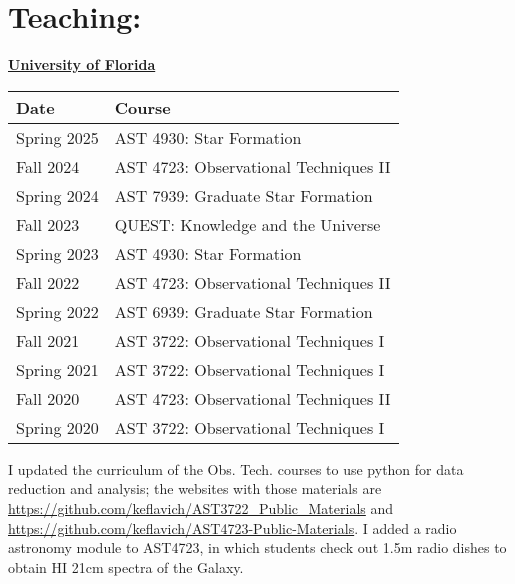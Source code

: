 \begin{minipage}{\textwidth}
\setlength{\extrarowheight}{4pt}
\section*{Teaching: }
\vspace{-6pt}

    \textbf{\underline{University of Florida}}

\begin{tabular}{ll}
    Date         & Course \\%
    \hline
     Spring 2025  &   AST 4930: Star Formation \\
     Fall 2024    &   AST 4723: Observational Techniques II \\
     Spring 2024  &   AST 7939: Graduate Star Formation \\
     Fall 2023    &   QUEST: Knowledge and the Universe \\
     Spring 2023  &   AST 4930: Star Formation \\
     Fall 2022    &   AST 4723: Observational Techniques II \\
     Spring 2022  &   AST 6939: Graduate Star Formation \\
     Fall 2021    &   AST 3722: Observational Techniques I  \\%
     Spring 2021  &   AST 3722: Observational Techniques I  \\%
     Fall 2020    &   AST 4723: Observational Techniques II \\%
     Spring 2020  &   AST 3722: Observational Techniques I  \\%
     \hline
\end{tabular}

I updated the curriculum of the Obs. Tech. courses to use python for data reduction and analysis; 
the websites with those materials are \url{https://github.com/keflavich/AST3722_Public_Materials}
and \url{https://github.com/keflavich/AST4723-Public-Materials}.  I added a radio astronomy module to 
AST4723, in which students check out 1.5m radio dishes to obtain HI 21cm spectra of the Galaxy.


\end{minipage}
